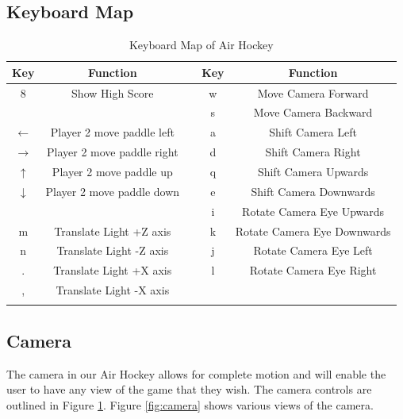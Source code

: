\documentclass[10pt]{report}
\begin{document}
\subsection*{Keyboard Map}
\begin{table}[!h]
\centering
\begin{tabular}{|c|c|c|c|c|}\hline 
\textbf{Key}   & \textbf{Function}              &  &  \textbf{Key}   & \textbf{Function}  \\\hline
8              &  Show High Score               &  &  w  &  Move Camera Forward           \\\hline
               &                                &  &  s  &  Move Camera Backward          \\\hline
$\leftarrow$   &  Player 2 move paddle left     &  &  a  &  Shift Camera Left             \\\hline
$\rightarrow$  &  Player 2 move paddle right    &  &  d  &  Shift Camera Right            \\\hline
$\uparrow$     &  Player 2 move paddle up       &  &  q  &  Shift Camera Upwards          \\\hline
$\downarrow$   &  Player 2 move paddle down     &  &  e  &  Shift Camera Downwards        \\\hline
               &                                &  &  i  &  Rotate Camera Eye Upwards     \\\hline
m              &  Translate Light +Z axis       &  &  k  &  Rotate Camera Eye Downwards   \\\hline
n              &  Translate Light -Z axis       &  &  j  &  Rotate Camera Eye Left        \\\hline
.              &  Translate Light +X axis       &  &  l  &  Rotate Camera Eye Right       \\\hline
,              &  Translate Light -X axis       &  &     &                                \\\hline
               &                                &  &     &                                \\\hline
\end{tabular}
\caption{Keyboard Map of Air Hockey}
\label{tab:keyboard}
\end{table}

\subsection*{Camera}
The camera in our Air Hockey allows for complete motion and will enable the user to have any view of the
game that they wish. The camera controls are outlined in Figure \ref{tab:keyboard}. Figure \ref{fig:camera}
shows various views of the camera. 
\end{document}
